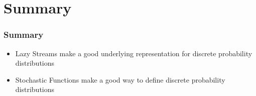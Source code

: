 \documentclass{beamer}
\newcommand{\code}[1]{\texttt{#1}}
\begin{document}



\section*{Summary}

\begin{frame}
  \frametitle<presentation>{Summary}

  \begin{itemize}
  \item \alert{Lazy Streams} make a good underlying representation for
  discrete probability distributions
  \item \alert{Stochastic Functions} make a good way to define
  discrete probability distributions
  \end{itemize}
  
\end{frame}
\end{document}

